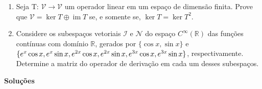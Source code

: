 \documentclass[12pt]{article}
\DeclareMathOperator{\im}{im}
\begin{document}
\begin{enumerate}
    \item Seja T: $\mathcal{V}\rightarrow\mathcal{V}$ um operador linear em um espaço de dimensão finita. Prove que $\mathcal{V}=\ker T \oplus \im T$ se, e somente se, $\ker T=\ker T^{2}$.
    
    \item Considere os subespaços vetoriais $\mathcal{I}$ e $\mathcal{N}$ do espaço $C^{\infty}(\mathbb{R})$ das funções contínuas com domínio $\mathbb{R}$, gerados por $\{\cos x, \sin x\}$ e $\{e^x \cos x, e^x \sin x, e^{2x} \cos x, e^{2x} \sin x, \newline e^{3x} \cos x, e^{3x} \sin x\}$, respectivamente. 
    Determine a matriz do operador de derivação em cada um desses subespaços.
\end{enumerate}

\begin{center}
    \textbf{Soluções}
\end{center}
\end{document}

